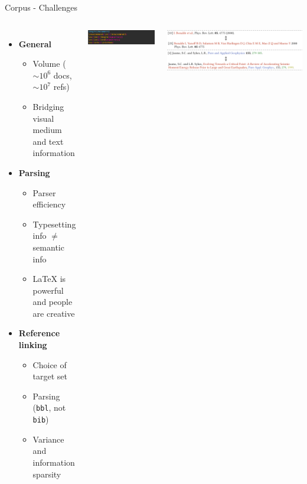 \documentclass[en,16:9,smallfoot]{sdqbeamer}
\begin{document}

   \begin{frame}{Corpus - Challenges}
   \begin{columns}
        \begin{itemize}
            \item \textbf{General}
            \begin{itemize}
                \item Volume ($\sim10^6$ docs, $\sim10^7$ refs)
                \item Bridging visual medium and text information  %
            \end{itemize}
            \item \textbf{Parsing}
            \begin{itemize}
                \item Parser efficiency
                \item Typesetting info $\neq$ semantic info
                \item \LaTeX{} is powerful and people are creative
            \end{itemize}
            \item \textbf{Reference linking}
            \begin{itemize}
                \item Choice of target set
                \item Parsing (\texttt{bbl}, not \texttt{bib})
                \item Variance and information sparsity
            \end{itemize}
        \end{itemize}
          \centering
          \includegraphics[width=0.8\linewidth]{imgs/renewcommand}

          \vspace{0.5cm}
          \includegraphics[width=\linewidth]{imgs/hardmatch_examples}
   \end{columns}
   \end{frame}
\end{document}
